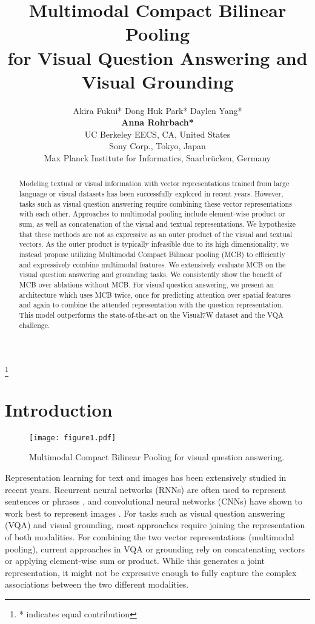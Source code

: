 \documentclass[11pt,letterpaper]{article}
\title{Multimodal Compact Bilinear Pooling\\for Visual Question Answering and Visual Grounding}
\author{
 Akira Fukui* \authSpace Dong Huk Park* \authSpace Daylen Yang* \\ {\bf Anna Rohrbach*} \authSpace {\bf Trevor Darrell} \authSpace {\bf Marcus Rohrbach}\\
UC Berkeley EECS,  CA, United States\\
Sony Corp., Tokyo, Japan\\
Max Planck Institute for Informatics, Saarbr{\"u}cken, Germany\\
}
\date{}
\newcommand\blfootnote[1]{\begingroup
  \renewcommand\thefootnote{}\footnote{#1}\addtocounter{footnote}{-1}\endgroup
}
\begin{document}
\maketitle
\blfootnote{* indicates equal contribution}


\begin{abstract}
Modeling textual or visual information with vector representations trained from large language or visual datasets has been successfully explored in recent years. However, tasks such as  visual question answering require combining these vector representations with each other. Approaches to multimodal pooling include element-wise product or sum, as well as concatenation of the visual and textual representations. We hypothesize that these methods are not as expressive as an outer product of the visual and textual vectors. As the outer product is typically infeasible due to its high dimensionality, we instead propose utilizing Multimodal Compact Bilinear pooling (MCB) to efficiently and expressively combine multimodal features. We extensively evaluate MCB on the visual question answering and grounding tasks. We consistently show the benefit of  MCB over ablations without MCB. For visual question answering, we present an architecture which uses MCB twice, once for predicting attention over spatial features and again to combine the attended representation with the question representation. This model outperforms the state-of-the-art on the Visual7W dataset and the VQA challenge.
\end{abstract}

\section{Introduction}
\begin{figure}[t]
\texttt{[image: figure1.pdf]}
\vspace{-0.5cm}
\caption{Multimodal Compact Bilinear Pooling for visual question answering.}
\label{fig:teaser}
\end{figure}

Representation learning for text and images has been extensively studied in recent years. Recurrent neural networks (RNNs) are often used to represent sentences or phrases \cite{sutskever14nips,kiros15nips}, and convolutional neural networks (CNNs) have shown to work best to represent images \cite{donahue14icml,he2015deep}. For tasks such as visual question answering (VQA) and visual grounding, most approaches require joining the representation of both modalities. For combining the two vector representations (multimodal pooling),
current approaches in VQA or grounding rely on concatenating vectors or applying element-wise sum or product. While this generates a joint representation, it might not be expressive enough to fully capture the complex associations between the two different modalities. 
    
\end{document}
